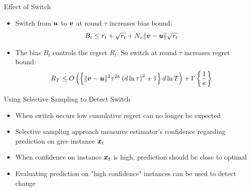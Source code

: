 \documentclass{beamer}
\begin{document}
\begin{frame}{Effect of Switch}
\begin{itemize}
\item Switch from ${\boldsymbol{u}}$ to ${\boldsymbol{v}}$ at round $\tau$ increases bias bound:\newline
\newline
\begin{equation*}
B_t\leq r_t+\sqrt{r_t}+N_{\tau}\|{\boldsymbol{v}}-{\boldsymbol{u}}\|\sqrt{r_t}
\end{equation*}\newline
\item The bias $B_t$ controls the regret $R_t$. So switch at round $\tau$ increases regret bound:\newline\newline
\begin{equation*}
 R_T\leq O\left(\left\{\|{\boldsymbol{v}}-{\boldsymbol{u}}\|^2{\tau}^{2\kappa}\left(d\ln{\tau}\right)^2+1\right\}d\ln{T}\right)+\Gamma\left\{\frac{1}{\kappa}\right\}
\end{equation*}
\end{itemize}
\end{frame}

\begin{frame}{Using Selective Sampling to Detect Switch}
\begin{itemize}
\item When switch occurs low cumulative regret can no longer be expected \newline
\item Selective sampling approach measures estimator's confidence regarding prediction on give instance ${\boldsymbol{x}}_{t}$ \newline
\item When confidence on instance ${\boldsymbol{x}}_{t}$ is high, prediction should be close to optimal \newline
\item Evaluating prediction on "high confidence" instances can be used to detect change \newline
\end{itemize}


\end{frame}
\end{document}
